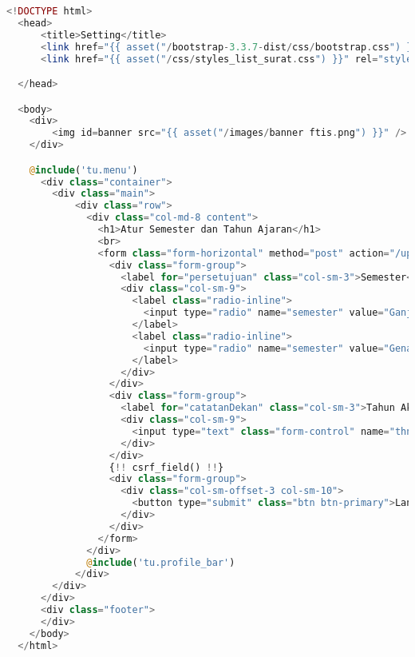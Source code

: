 \begin{lstlisting}[language=php,basicstyle=\tiny,caption=\textit{Setting} semester dan thnAjaran.blade.php]
	<!DOCTYPE html>
  <head>
      <title>Setting</title>
      <link href="{{ asset("/bootstrap-3.3.7-dist/css/bootstrap.css") }}" rel="stylesheet" type="text/css" />
      <link href="{{ asset("/css/styles_list_surat.css") }}" rel="stylesheet" type="text/css">

  </head>

  <body>
    <div>
        <img id=banner src="{{ asset("/images/banner ftis.png") }}" />
    </div>

    @include('tu.menu')
      <div class="container">
        <div class="main">
            <div class="row">
              <div class="col-md-8 content">
                <h1>Atur Semester dan Tahun Ajaran</h1>
                <br>
                <form class="form-horizontal" method="post" action="/updateSemester">
                  <div class="form-group">
                    <label for="persetujuan" class="col-sm-3">Semester</label>
                    <div class="col-sm-9">
                      <label class="radio-inline">
                        <input type="radio" name="semester" value="Ganjil" checked required>Ganjil
                      </label>
                      <label class="radio-inline">
                        <input type="radio" name="semester" value="Genap">Genap
                      </label>
                    </div>
                  </div>
                  <div class="form-group">
                    <label for="catatanDekan" class="col-sm-3">Tahun Akademik</label>
                    <div class="col-sm-9">
                      <input type="text" class="form-control" name="thnAkademik">
                    </div>
                  </div>
                  {!! csrf_field() !!}
                  <div class="form-group">
                    <div class="col-sm-offset-3 col-sm-10">
                      <button type="submit" class="btn btn-primary">Lanjutkan</button>
                    </div>
                  </div>
                </form>
              </div>
              @include('tu.profile_bar')
            </div>
        </div>
      </div>
      <div class="footer">
      </div>
    </body>
  </html>

\end{lstlisting}

